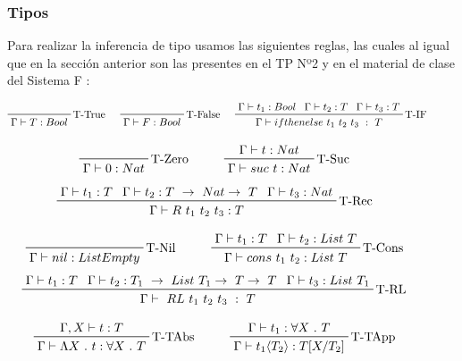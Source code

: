 \documentclass[12pt, titlepage, a4paper]{article}
\begin{document}
\subsubsection{Tipos}
Para realizar la inferencia de tipo usamos las siguientes reglas, las cuales al igual que en la sección anterior son las
presentes en el TP Nº2 \cite{tp2:lambdaCalculoSimpleTipado} y en el material de clase del Sistema F \cite{ALP:Polimorfismo}:

\begin{displaymath}
    \prftree[r]{T-True}{\Gamma \vdash T: Bool} \hspace{0.5cm}
    \prftree[r]{T-False}{\Gamma \vdash F:  Bool} \hspace{0.5cm}  
    \prftree[r]{T-IF}{\Gamma \vdash t_1 : Bool}{\Gamma \vdash t_2 : T}{\Gamma \vdash t_3 : T}{\Gamma \vdash ifthenelse \ t_1 \ t_2 \ t_3 \ : \ T} \hspace{1cm}
\end{displaymath}

\begin{displaymath}
    \prftree[r]{T-Zero}{\Gamma \vdash 0 : Nat} \hspace{1cm}
    \prftree[r]{T-Suc}{\Gamma \vdash t : Nat}{\Gamma \vdash suc \ t : Nat} \hspace{1cm}
\end{displaymath}
\begin{displaymath}
    \prftree[r]{T-Rec}{\Gamma \vdash t_1 : T}{\Gamma \vdash t_2 : T \ \rightarrow \ Nat \rightarrow \ T}{\Gamma \vdash t_3 : Nat}{\Gamma \vdash R \ t_1 \ t_2 \ t_3 : T} \hspace{1cm}
\end{displaymath}

\begin{displaymath}
    \prftree[r]{T-Nil}{\Gamma \vdash nil : ListEmpty} \hspace{1cm}
    \prftree[r]{T-Cons}{\Gamma \vdash t_1 : T}{\Gamma \vdash t_2 : List \ T}{\Gamma \vdash cons \ t_1 \ t_2 :  List \ T} \hspace{1cm}
\end{displaymath}
\begin{displaymath}
    \prftree[r]{T-RL}{\Gamma \vdash t_1 : T}{\Gamma \vdash t_2 : T_1 \ \rightarrow \ List \ T_1 \rightarrow \ T \rightarrow \ T}{\Gamma \vdash t_3 : List \ T_1}{\Gamma \vdash \ RL \ t_1 \ t_2 \ t_3 \ : \ T} \hspace{1cm}
\end{displaymath}

\begin{displaymath}
    \prftree[r]{T-TAbs}{\Gamma, X \vdash t : T}{\Gamma \vdash \Lambda X \ . \ t : \forall X \ . \ T} \hspace{1cm}
    \prftree[r]{T-TApp}{\Gamma \vdash t_1 : \forall X \ . \ T}{\Gamma \vdash t_1 \langle T_2 \rangle : T[X/T_2]} \hspace{1cm}
\end{displaymath}
\end{document}

